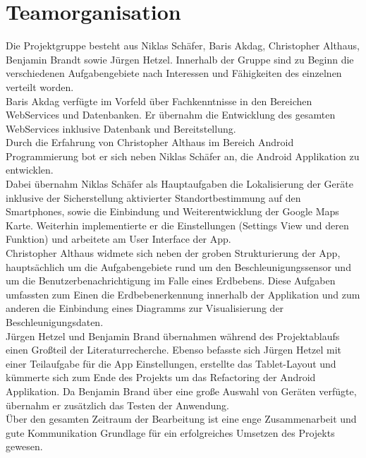 \section{Teamorganisation}
Die Projektgruppe besteht aus Niklas Schäfer, Baris Akdag, Christopher Althaus, Benjamin Brandt sowie Jürgen Hetzel. Innerhalb der Gruppe sind zu Beginn die verschiedenen Aufgabengebiete nach Interessen und Fähigkeiten des einzelnen verteilt worden.\\
Baris Akdag verfügte im Vorfeld über Fachkenntnisse in den Bereichen WebServices und Datenbanken. Er übernahm die Entwicklung des gesamten WebServices inklusive Datenbank und Bereitstellung.\\
Durch die Erfahrung von Christopher Althaus im Bereich Android Programmierung bot er sich neben Niklas Schäfer an, die Android Applikation zu entwicklen.\\
Dabei übernahm Niklas Schäfer als Hauptaufgaben die Lokalisierung der Geräte inklusive der Sicherstellung aktivierter Standortbestimmung auf den Smartphones, sowie die Einbindung und Weiterentwicklung der Google Maps Karte. Weiterhin implementierte er die Einstellungen (Settings View und deren Funktion) und arbeitete am User Interface der App.\\ 
Christopher Althaus widmete sich neben der groben Strukturierung der App, hauptsächlich um die Aufgabengebiete rund um den Beschleunigungssensor und um die Benutzerbenachrichtigung im Falle eines Erdbebens. Diese Aufgaben umfassten zum Einen die Erdbebenerkennung innerhalb der Applikation und zum anderen die Einbindung eines Diagramms zur Visualisierung der Beschleunigungsdaten.\\
Jürgen Hetzel und Benjamin Brand übernahmen während des Projektablaufs einen Großteil der Literaturrecherche. Ebenso befasste sich Jürgen Hetzel mit einer Teilaufgabe für die App Einstellungen, erstellte das Tablet-Layout und kümmerte sich zum Ende des Projekts um das Refactoring der Android Applikation.
Da Benjamin Brand über eine große Auswahl von Geräten verfügte, übernahm er zusätzlich das Testen der Anwendung.\\
Über den gesamten Zeitraum der Bearbeitung ist eine enge Zusammenarbeit und gute Kommunikation Grundlage für ein erfolgreiches Umsetzen des Projekts gewesen.
\newpage